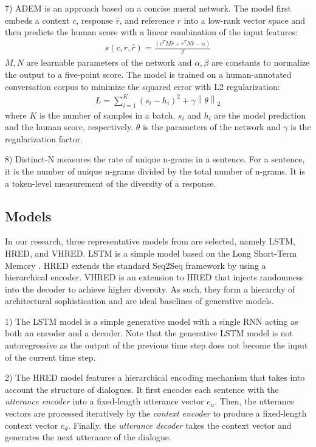 \documentclass[conference]{IEEEtran}
\begin{document}
    7) ADEM \cite{ADEM} is an approach based on a concise nueral network. The model first embeds a context $c$, response $\hat{r}$, and reference $r$ into a low-rank vector space and then predicts the human score with a linear combination of the input features:
    \begin{align}
        s(c, r, \hat{r}) = \frac{(c^T M \hat{r} + r^T N \hat{r} - \alpha)}{\beta}
    \end{align}
    $M, N$ are learnable parameters of the network and $\alpha, \beta$ are constants to normalize the output to a five-point score. The model is trained on a human-annotated conversation corpus to minimize the squared error with L2 regularization:
    \begin{align}
        L = \sum_{i=1}^{K} (s_i - h_i)^2 + \gamma \left\| \theta \right\| _2
    \end{align}
    where $K$ is the number of samples in a batch. $s_i$ and $h_i$ are the model prediction and the human score, respectively. $\theta$ is the parameters of the network and $\gamma$ is the regularization factor.

    8) Distinct-N \cite{MMI} measures the rate of unique n-grams in a sentence. For a sentence, it is the number of unique n-grams divided by the total number of n-grams. It is a token-level measurement of the diversity of a response.

    \subsection{Models}
    In our research, three representative models from \cite{VHRED} are selected, namely LSTM, HRED, and VHRED. LSTM is a simple model based on the Long Short-Term Memory \cite{LSTM}. HRED extends the standard Seq2Seq framework by using a hierarchical encoder. VHRED is an extension to HRED that injects randomness into the decoder to achieve higher diversity. As such, they form a hierarchy of architectural sophistication and are ideal baselines of generative models.

    1) The LSTM model is a simple generative model with a single RNN acting as both an encoder and a decoder. Note that the generative LSTM model is not autoregressive as the output of the previous time step does not become the input of the current time step.

    2) The HRED model \cite{hred-qs,HRED} features a hierarchical encoding mechanism that takes into account the structure of dialogues. It first encodes each sentence with the \emph{utterance encoder} into a fixed-length utterance vector $e_u$. Then, the utterance vectors are processed iteratively by the \emph{context encoder} to produce a fixed-length context vector $e_d$. Finally, the \emph{utterance decoder} takes the context vector and generates the next utterance of the dialogue.
\end{document}
